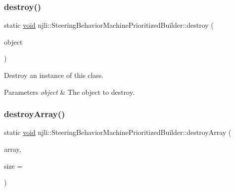 \subsubsection{\texorpdfstring{destroy()}{destroy()}}
{\footnotesize\ttfamily static \mbox{\hyperlink{_thread_8h_af1e856da2e658414cb2456cb6f7ebc66}{void}} njli\+::\+Steering\+Behavior\+Machine\+Prioritized\+Builder\+::destroy (\begin{DoxyParamCaption}\item[{\mbox{\hyperlink{classnjli_1_1_steering_behavior_machine_prioritized_builder}{Steering\+Behavior\+Machine\+Prioritized\+Builder}} $\ast$}]{object }\end{DoxyParamCaption})\hspace{0.3cm}{\ttfamily [static]}}

Destroy an instance of this class.


\begin{DoxyParams}{Parameters}
{\em object} & The object to destroy. \\
\hline
\end{DoxyParams}
\mbox{\label{classnjli_1_1_steering_behavior_machine_prioritized_builder_af2ed77dcd5f7ce585d1d82b8c5d75c46}} 
\subsubsection{\texorpdfstring{destroy\+Array()}{destroyArray()}}
{\footnotesize\ttfamily static \mbox{\hyperlink{_thread_8h_af1e856da2e658414cb2456cb6f7ebc66}{void}} njli\+::\+Steering\+Behavior\+Machine\+Prioritized\+Builder\+::destroy\+Array (\begin{DoxyParamCaption}\item[{\mbox{\hyperlink{classnjli_1_1_steering_behavior_machine_prioritized_builder}{Steering\+Behavior\+Machine\+Prioritized\+Builder}} $\ast$$\ast$}]{array,  }\item[{const \mbox{\hyperlink{_util_8h_a10e94b422ef0c20dcdec20d31a1f5049}{u32}}}]{size = {} }\end{DoxyParamCaption})\hspace{0.3cm}{\ttfamily [static]}}

